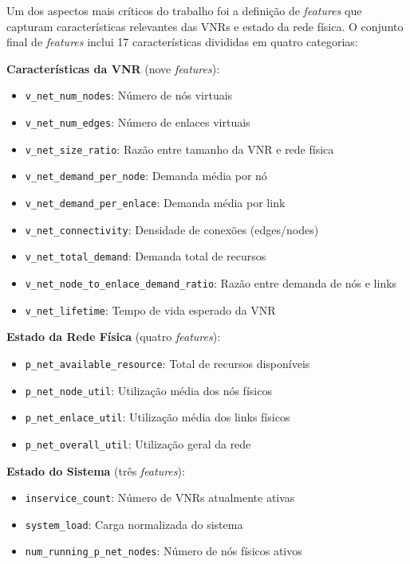 \documentclass[conference]{IEEEtran}
\begin{document}
Um dos aspectos mais críticos do trabalho foi a definição de \textit{features} que capturam características relevantes das VNRs e estado da rede física. O conjunto final de \textit{features} inclui 17 características divididas em quatro categorias:

\textbf{Características da VNR} (nove \textit{features}):
\begin{itemize}
    \item \texttt{v\_net\_num\_nodes}: Número de nós virtuais
    \item \texttt{v\_net\_num\_edges}: Número de enlaces virtuais
    \item \texttt{v\_net\_size\_ratio}: Razão entre tamanho da VNR e rede física
    \item \texttt{v\_net\_demand\_per\_node}: Demanda média por nó
    \item \texttt{v\_net\_demand\_per\_enlace}: Demanda média por link
    \item \texttt{v\_net\_connectivity}: Densidade de conexões (edges/nodes)
    \item \texttt{v\_net\_total\_demand}: Demanda total de recursos
    \item \texttt{v\_net\_node\_to\_enlace\_demand\_ratio}: Razão entre demanda de nós e links
    \item \texttt{v\_net\_lifetime}: Tempo de vida esperado da VNR
\end{itemize}

\textbf{Estado da Rede Física} (quatro \textit{features}):
\begin{itemize}
    \item \texttt{p\_net\_available\_resource}: Total de recursos disponíveis
    \item \texttt{p\_net\_node\_util}: Utilização média dos nós físicos
    \item \texttt{p\_net\_enlace\_util}: Utilização média dos links físicos
    \item \texttt{p\_net\_overall\_util}: Utilização geral da rede
\end{itemize}

\textbf{Estado do Sistema} (três \textit{features}):
\begin{itemize}
    \item \texttt{inservice\_count}: Número de VNRs atualmente ativas
    \item \texttt{system\_load}: Carga normalizada do sistema
    \item \texttt{num\_running\_p\_net\_nodes}: Número de nós físicos ativos
\end{itemize}
\end{document}
